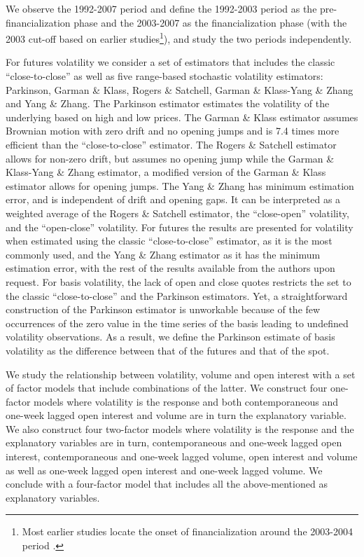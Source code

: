 \documentclass[
]{book}
\let\rmarkdownfootnote\footnote%
\def\footnote{\protect\rmarkdownfootnote}
\begin{document}
We observe the 1992-2007 period and define the 1992-2003 period as the pre-financialization phase and the 2003-2007 as the financialization phase (with the 2003 cut-off based on earlier studies\footnote{Most earlier studies locate the onset of financialization around the 2003-2004 period \citep{basak_model_2016, cheng_financialization_2014, hamilton_effects_2015, irwin_index_2011, irwin_financialization_2012, irwin_testing_2012, tang_index_2012}.}), and study the two periods independently.

For futures volatility we consider a set of estimators that includes the classic ``close-to-close'' as well as five range-based stochastic volatility estimators: Parkinson, Garman \& Klass, Rogers \& Satchell, Garman \& Klass-Yang \& Zhang and Yang \& Zhang. The Parkinson estimator estimates the volatility of the underlying based on high and low prices. The Garman \& Klass estimator assumes Brownian motion with zero drift and no opening jumps and is 7.4 times more efficient than the ``close-to-close'' estimator. The Rogers \& Satchell estimator allows for non-zero drift, but assumes no opening jump while the Garman \& Klass-Yang \& Zhang estimator, a modified version of the Garman \& Klass estimator allows for opening jumps. The Yang \& Zhang has minimum estimation error, and is independent of drift and opening gaps. It can be interpreted as a weighted average of the Rogers \& Satchell estimator, the ``close-open'' volatility, and the ``open-close'' volatility. For futures the results are presented for volatility when estimated using the classic ``close-to-close'' estimator, as it is the most commonly used, and the Yang \& Zhang estimator as it has the minimum estimation error, with the rest of the results available from the authors upon request. For basis volatility, the lack of open and close quotes restricts the set to the classic ``close-to-close'' and the Parkinson estimators. Yet, a straightforward construction of the Parkinson estimator is unworkable because of the few occurrences of the zero value in the time series of the basis leading to undefined volatility observations. As a result, we define the Parkinson estimate of basis volatility as the difference between that of the futures and that of the spot.

We study the relationship between volatility, volume and open interest with a set of factor models that include combinations of the latter. We construct four one-factor models where volatility is the response and both contemporaneous and one-week lagged open interest and volume are in turn the explanatory variable. We also construct four two-factor models where volatility is the response and the explanatory variables are in turn, contemporaneous and one-week lagged open interest, contemporaneous and one-week lagged volume, open interest and volume as well as one-week lagged open interest and one-week lagged volume. We conclude with a four-factor model that includes all the above-mentioned as explanatory variables.
\end{document}
